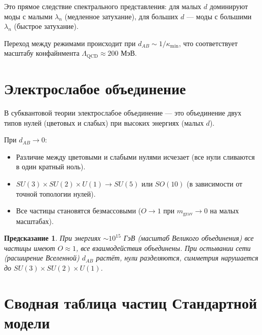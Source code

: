 \documentclass[11pt,a4paper]{article}
\newtheorem{prediction}{Предсказание}[section]
\theoremstyle{definition}
\begin{document}
Это прямое следствие спектрального представления: для малых $d$ доминируют моды с малыми $\lambda_n$ (медленное затухание), для больших $d$ — моды с большими $\lambda_n$ (быстрое затухание).

Переход между режимами происходит при $d_{AB} \sim 1/\kappa_{\min}$, что соответствует масштабу конфайнмента $\Lambda_{\text{QCD}} \approx 200$ МэВ.

\section{Электрослабое объединение}

В субквантовой теории электрослабое объединение — это объединение двух типов нулей (цветовых и слабых) при высоких энергиях (малых $d$).

При $d_{AB} \to 0$:
\begin{itemize}
    \item Различие между цветовыми и слабыми нулями исчезает (все нули сливаются в один кратный ноль).
    \item $SU(3) \times SU(2) \times U(1) \to SU(5)$ или $SO(10)$ (в зависимости от точной топологии нулей).
    \item Все частицы становятся безмассовыми ($O \to 1$ при $m_{\text{grav}} \to 0$ на малых масштабах).
\end{itemize}

\begin{prediction}
При энергиях $\sim 10^{15}$ ГэВ (масштаб Великого объединения) все частицы имеют $O \approx 1$, все взаимодействия объединены. При остывании сети (расширение Вселенной) $d_{AB}$ растёт, нули разделяются, симметрия нарушается до $SU(3) \times SU(2) \times U(1)$.
\end{prediction}

\section{Сводная таблица частиц Стандартной модели}
\end{document}
